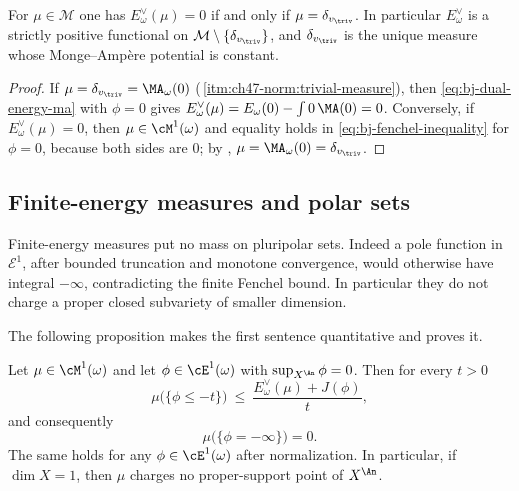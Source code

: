 \begin{corollary}
\label{cor:ch47-dual-zero}
For $\mu\in\mathcal M$ one has $E^\vee_\omega(\mu)=0$ if and only if
$\mu=\delta_{v_{\triv}}$.  In particular $E^\vee_\omega$ is a strictly
positive functional on $\mathcal M\setminus\{\delta_{v_{\triv}}\}$, and
$\delta_{v_{\triv}}$ is the unique measure whose Monge--Amp\`ere
potential is constant.
\end{corollary}

\begin{proof}
If $\mu=\delta_{v_{\triv}}=\MA_\omega(0)$
(\,\cref{itm:ch47-norm:trivial-measure}),
then \eqref{eq:bj-dual-energy-ma} with $\phi=0$ gives
$E^\vee_\omega(\mu)=E_\omega(0)-\int0\,\MA(0)=0$.  Conversely, if
$E^\vee_\omega(\mu)=0$, then $\mu\in\cM^1(\omega)$ and equality holds
in \eqref{eq:bj-fenchel-inequality} for $\phi=0$, because both sides are
$0$; by , $\mu=\MA_\omega(0)
=\delta_{v_{\triv}}$.
\end{proof}

\subsection{Finite-energy measures and polar sets}
\label{sec:ch47-polar}

Finite-energy measures put no mass on pluripolar sets.  Indeed a pole
function in $\mathcal E^1$, after bounded truncation and monotone
convergence, would otherwise have integral $-\infty$, contradicting the
finite Fenchel bound.  In particular they do not charge a proper closed
subvariety of smaller dimension.

The following proposition makes the first sentence quantitative and proves
it.

\begin{proposition}
\label{prop:ch47-no-polar-mass}
Let $\mu\in\cM^1(\omega)$ and let $\phi\in\cE^1(\omega)$ with
$\sup_{X^{\An}}\phi=0$.  Then for every $t>0$
\[
 \mu\bigl(\{\phi\le-t\}\bigr)\ \le\ \frac{E^\vee_\omega(\mu)+J(\phi)}{t},
\]
and consequently
\[
 \mu\bigl(\{\phi=-\infty\}\bigr)=0 .
\]
The same holds for any $\phi\in\cE^1(\omega)$ after normalization.  In
particular, if $\dim X=1$, then $\mu$ charges no proper-support point
of $X^{\An}$.
\end{proposition}

